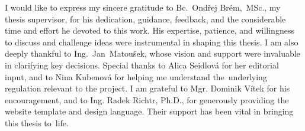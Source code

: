 \documentclass[english,bachelor,oneside]{ctufit-thesis} %
\begin{document}
 
\frontmatter\frontmatterinit %

\thispagestyle{empty}\maketitle\thispagestyle{empty}\cleardoublepage %


\imprintpage %
\stopTOCentries

\begin{acknowledgmentpage}
    I would like to express my sincere gratitude to Bc.~Ondřej Brém,~MSc., my thesis supervisor, for his dedication, guidance, feedback, and the considerable time and effort he devoted to this work. His expertise, patience, and willingness to discuss and challenge ideas were instrumental in shaping this thesis.
    I am also deeply thankful to Ing.~Jan~Matoušek, whose vision and support were invaluable in clarifying key decisions.
    Special thanks to Alica Seidlová for her editorial input, and to Nina Kubenová for helping me understand the~underlying regulation relevant to the project.
    I am grateful to Mgr. Dominik Vítek for his encouragement, and to Ing. Radek Richtr, Ph.D., for generously providing the website template and design language.
    Their support has been vital in bringing this thesis to~life.
\end{acknowledgmentpage} 
\end{document}
